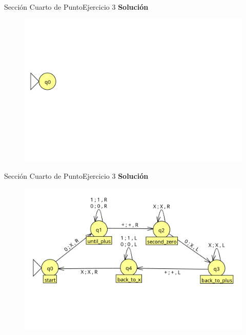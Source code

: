 \documentclass[10pt, envcountsect, presentation, aspectratio=169]{beamer}
\begin{document}
\begin{frame}{Sección Cuarto de Punto}{Ejercicio 3}
    \textbf{Solución}\\
    \begin{figure}
        \includegraphics[scale=0.25]{images/mct1ej3_1.png}
    \end{figure}
\end{frame}


\begin{frame}{Sección Cuarto de Punto}{Ejercicio 3}
    \textbf{Solución}\\
    \begin{figure}
        \includegraphics[scale=0.25]{images/mct1ej3_2.png}
    \end{figure}
\end{frame}

\end{document}
